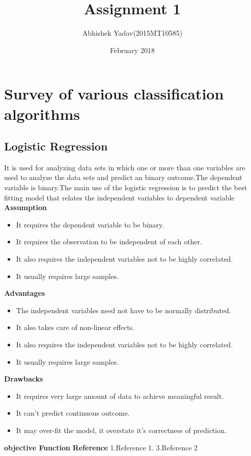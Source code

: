 \documentclass{article}
\title{Assignment 1}
\author{Abhishek Yadav(2015MT10585) }
\date{February 2018}
\begin{document}
\maketitle
\section{Survey of various classification algorithms}
\subsection{Logistic Regression}
It is used for analyzing data sets in which one or more than one variables are used to analyze the data sets and predict an binary outcome.The dependent variable is binary.The main use of the logistic regression is to predict the best fitting model that relates the independent variables to dependent variable\newline
\textbf{Assumption}\newline
\begin{itemize}
    
 \item It requires the dependent variable to be binary.
 \item It requires the observation to be independent of each other.
 \item It also requires the independent variables not to be highly correlated.
 \item It usually requires large samples.
\end{itemize}
\textbf{Advantages}\newline
\begin{itemize}
\item The independent variables need not have to be normally distributed.
\item It also takes care of non-linear effects.
\item It also requires the independent variables not to be highly correlated.
\item It usually requires large samples.
\end{itemize}
\textbf{Drawbacks}\newline
\begin{itemize}
\item It requires very large amount of data to achieve meaningful result.
\item It can't predict continuous outcome.
\item It may over-fit the model, it overstate it's correctness of prediction. 
\end{itemize}
\textbf{objective Function}\newline
\textbf{Reference}\newline
1.Reference 1.\newline
3.Reference 2 \newline
\end{document}
